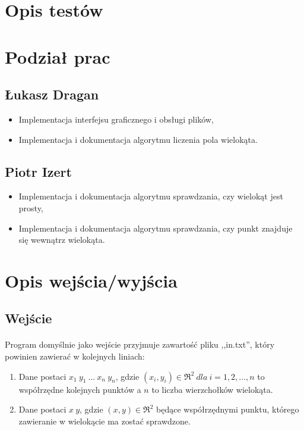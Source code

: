 \documentclass{article}
\begin{document}
\section{Opis testów}



\section{Podział prac}
\subsection{Łukasz Dragan}
\begin{itemize}
\item Implementacja interfejsu graficznego i obsługi plików,
\item Implementacja i dokumentacja algorytmu liczenia pola wielokąta.
\end{itemize}

\subsection{Piotr Izert}
\begin{itemize}
\item Implementacja i dokumentacja algorytmu sprawdzania, czy wielokąt jest prosty,
\item Implementacja i dokumentacja algorytmu sprawdzania, czy punkt znajduje się wewnątrz wielokąta.
\end{itemize}









\section{Opis wejścia/wyjścia}

\subsection{Wejście}

\paragraph{}
Program domyślnie jako wejście przyjmuje zawartość pliku ,,in.txt'', który powinien zawierać w kolejnych liniach:
\begin{enumerate}
\item Dane postaci \(x_1\ y_1\ ...\ x_n\ y_n\), gdzie \((x_i,y_i) \in \Re^{2} \ dla\ i=1,2,...,n\) to współrzędne kolejnych punktów a \(n\) to liczba wierzchołków wielokąta.
\item Dane postaci \(x\ y\), gdzie \((x,y) \in \Re^{2}\) będące współrzędnymi punktu, którego zawieranie w wielokącie ma zostać sprawdzone.
\end{enumerate}
\end{document}

